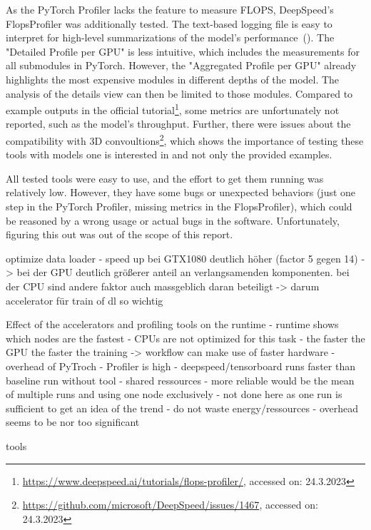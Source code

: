 \documentclass[12pt, a4paper, hidelinks]{article}
\begin{document}
As the PyTorch Profiler lacks the feature to measure \ac{FLOPS}, DeepSpeed's FlopsProfiler was additionally tested. The text-based logging file is easy to interpret for high-level summarizations of the model's performance~(). The "Detailed Profile per GPU" is less intuitive, which includes the measurements for all submodules in PyTorch. However, the "Aggregated Profile per GPU" already highlights the most expensive modules in different depths of the model. The analysis of the details view can then be limited to those modules.
Compared to example outputs in the official tutorial\footnote{\url{https://www.deepspeed.ai/tutorials/flops-profiler/}, accessed on: 24.3.2023}, some metrics are unfortunately not reported, such as the model's throughput. Further, there were issues about the compatibility with 3D convoultions\footnote{\url{https://github.com/microsoft/DeepSpeed/issues/1467}, accessed on: 24.3.2023}, which shows the importance of testing these tools with models one is interested in and not only the provided examples.

All tested tools were easy to use, and the effort to get them running was relatively low. However, they have some bugs or unexpected behaviors (just one step in the PyTorch Profiler, missing metrics in the FlopsProfiler), which could be reasoned by a wrong usage or actual bugs in the software. Unfortunately, figuring this out was out of the scope of this report.
\iffalse

optimize data loader
    - speed up bei GTX1080 deutlich höher (factor 5 gegen 14) -> bei der GPU deutlich größerer anteil an verlangsamenden komponenten. bei der CPU sind andere faktor auch massgeblich daran beteiligt
        -> darum accelerator für train of dl so wichtig

Effect of the accelerators and profiling tools on the runtime
- runtime shows which nodes are the fastest
    - CPUs are not optimized for this task
    - the faster the GPU the faster the training -> workflow can make use of faster hardware
    - overhead of PyTroch - Profiler is high
    - deepspeed/tensorboard runs faster than baseline run without tool
        - shared ressources
        - more reliable would be the mean of multiple runs and using one node exclusively
            - not done here as one run is sufficient to get an idea of the trend
            - do not waste energy/ressources
        - overhead seems to be nor too significant

tools
\end{document}
